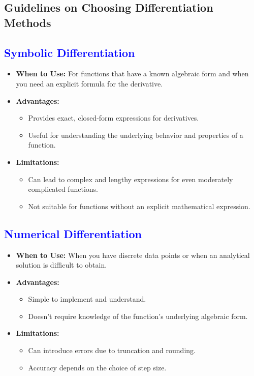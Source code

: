 \subsection{Guidelines on Choosing Differentiation Methods}

\subsection*{\textcolor{blue}{Symbolic Differentiation}}
\begin{itemize}
    \item \textbf{When to Use:} For functions that have a known algebraic form and when you need an explicit formula for the derivative.
    \item \textbf{Advantages:}
    \begin{itemize}
        \item Provides exact, closed-form expressions for derivatives.
        \item Useful for understanding the underlying behavior and properties of a function.
    \end{itemize}
    \item \textbf{Limitations:}
    \begin{itemize}
        \item Can lead to complex and lengthy expressions for even moderately complicated functions.
        \item Not suitable for functions without an explicit mathematical expression.
    \end{itemize}
\end{itemize}

\subsection*{\textcolor{blue}{Numerical Differentiation}}

\begin{itemize}
    \item \textbf{When to Use:} When you have discrete data points or when an analytical solution is difficult to obtain.
    \item \textbf{Advantages:}
    \begin{itemize}
        \item Simple to implement and understand.
        \item Doesn't require knowledge of the function's underlying algebraic form.
    \end{itemize}
    \item \textbf{Limitations:}
    \begin{itemize}
        \item Can introduce errors due to truncation and rounding.
        \item Accuracy depends on the choice of step size.
    \end{itemize}
\end{itemize}

